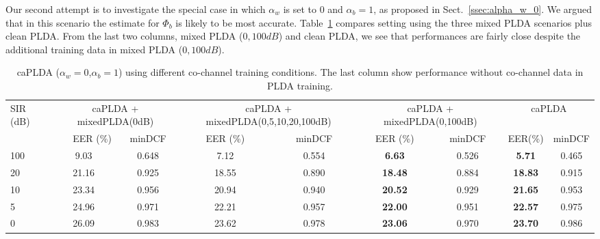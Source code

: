 Our second attempt is to investigate the special case in which $\alpha_w$ is set to $0$ and $\alpha_b=1$, as proposed in Sect.~\ref{ssec:alpha_w_0}. 
We argued that in this scenario the estimate for $\Phi_b$ is likely to be most accurate. 
Table~\ref{tbl:alpha_w_0} compares setting using the three mixed PLDA scenarios plus clean PLDA. 
From the last two columns, mixed PLDA ($0, 100dB$) and clean PLDA, we see that performances are fairly close despite the additional training data in mixed PLDA ($0,100dB$). 

\begin{table}[h!]
	\small
	\centering
	\resizebox{\textwidth}{!}
	{
	\begin{tabular}{|l|c|c|c|c|c|c|c|c|c|c|c|}
		\hline
		\multirow{2}{*}{SIR (dB)} & \multicolumn{3}{c|}{caPLDA + mixedPLDA(0dB)}          & \multicolumn{3}{c|}{caPLDA + mixedPLDA(0,5,10,20,100dB)}  & \multicolumn{3}{c|}{caPLDA + mixedPLDA(0,100dB)}             & \multicolumn{2}{c|}{caPLDA} \\ \cline{2-12} 
		& \multicolumn{2}{r|}{EER (\%)} & minDCF         & \multicolumn{2}{c|}{EER (\%)} & minDCF             & \multicolumn{2}{c|}{EER (\%)}       & minDCF          & EER(\%)               & minDCF       \\ \hline
		100                       & \multicolumn{2}{c|}{9.03}     & 0.648          & \multicolumn{2}{c|}{7.12}     & 0.554              & \multicolumn{2}{c|}{\textbf{6.63}}  & 0.526           & \textbf{5.71}         & 0.465        \\ \hline
		20                        & \multicolumn{2}{c|}{21.16}    & 0.925          & \multicolumn{2}{c|}{18.55}    & 0.890              & \multicolumn{2}{c|}{\textbf{18.48}} & 0.884           & \textbf{18.83}        & 0.915        \\ \hline
		10                        & \multicolumn{2}{c|}{23.34}    & 0.956          & \multicolumn{2}{c|}{20.94}    & 0.940              & \multicolumn{2}{c|}{\textbf{20.52}} & 0.929           & \textbf{21.65}        & 0.953        \\ \hline
		5                         & \multicolumn{2}{c|}{24.96}    & 0.971          & \multicolumn{2}{c|}{22.21}    & 0.957              & \multicolumn{2}{c|}{\textbf{22.00}} & 0.951           & \textbf{22.57}        & 0.975        \\ \hline
		0                         & \multicolumn{2}{c|}{26.09}    & 0.983          & \multicolumn{2}{c|}{23.62}    & 0.978              & \multicolumn{2}{c|}{\textbf{23.06}} & 0.970           & \textbf{23.70}        & 0.986        \\ \hline
	\end{tabular}
	}
	\caption{caPLDA ($\alpha_w=0$,$\alpha_b=1$) using different co-channel training conditions. The last column show performance without co-channel data in PLDA training.}
	\label{tbl:alpha_w_0}
\end{table}


